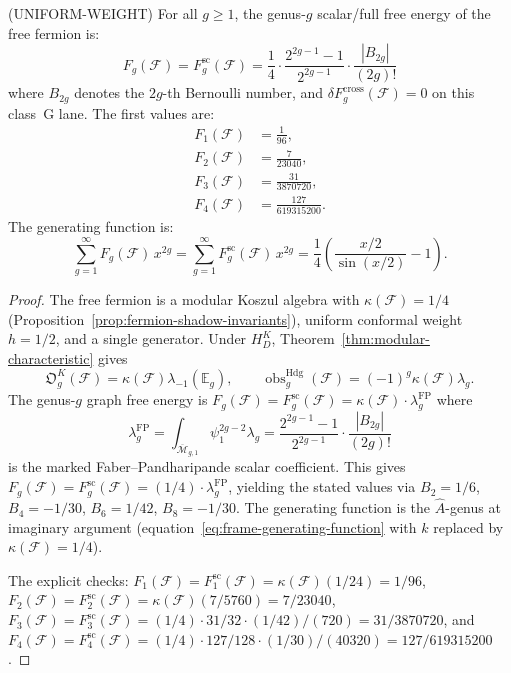 \begin{theorem}
\textup{(}UNIFORM-WEIGHT\textup{})
\label{thm:fermion-genus-expansion}
For all $g \geq 1$, the genus-$g$ scalar/full free energy of the free
fermion is:
\begin{equation}\label{eq:fermion-Fg}
F_g(\mathcal{F})
=F_g^{\mathrm{sc}}(\mathcal{F})
= \frac{1}{4} \cdot \frac{2^{2g-1}-1}{2^{2g-1}}
 \cdot \frac{|B_{2g}|}{(2g)!}
\end{equation}
where $B_{2g}$ denotes the $2g$-th Bernoulli number, and
$\delta F_g^{\mathrm{cross}}(\mathcal F)=0$ on this class~G lane.
The first values are:
\begin{align}
F_1(\mathcal{F}) &= \frac{1}{96},
 \label{eq:fermion-F1} \\
F_2(\mathcal{F}) &= \frac{7}{23040},
 \label{eq:fermion-F2} \\
F_3(\mathcal{F}) &= \frac{31}{3870720},
 \label{eq:fermion-F3} \\
F_4(\mathcal{F}) &= \frac{127}{619315200}.
 \label{eq:fermion-F4}
\end{align}
The generating function is:
\begin{equation}\label{eq:fermion-generating-function}
\sum_{g=1}^{\infty} F_g(\mathcal{F})\,x^{2g}
=\sum_{g=1}^{\infty} F_g^{\mathrm{sc}}(\mathcal{F})\,x^{2g}
= \frac{1}{4}\left(\frac{x/2}{\sin(x/2)} - 1\right).
\end{equation}
\end{theorem}

\begin{proof}
The free fermion is a modular Koszul algebra
with $\kappa(\mathcal{F}) = 1/4$
\textup{(}Proposition~\textup{\ref{prop:fermion-shadow-invariants}}\textup{)},
uniform conformal weight $h = 1/2$, and a single generator. Under
$H_D^K$, Theorem~\ref{thm:modular-characteristic} gives
\[
 \mathfrak O_g^K(\mathcal F)
 =\kappa(\mathcal F)\lambda_{-1}(\mathbb E_g),
 \qquad
 \operatorname{obs}^{\mathrm{Hdg}}_g(\mathcal F)
 =(-1)^g\kappa(\mathcal F)\lambda_g.
\]
The genus-$g$ graph free energy is
$F_g(\mathcal{F})=F_g^{\mathrm{sc}}(\mathcal{F})
 = \kappa(\mathcal{F}) \cdot \lambda_g^{\mathrm{FP}}$ where
\[
\lambda_g^{\mathrm{FP}}
=\int_{\overline{\mathcal M}_{g,1}}\psi_1^{2g-2}\lambda_g
= \frac{2^{2g-1}-1}{2^{2g-1}} \cdot \frac{|B_{2g}|}{(2g)!}
\]
is the marked Faber--Pandharipande scalar coefficient. This gives
$F_g(\mathcal{F})=F_g^{\mathrm{sc}}(\mathcal{F})
= (1/4) \cdot \lambda_g^{\mathrm{FP}}$, yielding the
stated values via $B_2 = 1/6$, $B_4 = -1/30$, $B_6 = 1/42$,
$B_8 = -1/30$.
The generating function is the $\hat{A}$-genus at imaginary argument
(equation~\eqref{eq:frame-generating-function} with $k$ replaced
by $\kappa(\mathcal F)=1/4$).

The explicit checks:
$F_1(\mathcal F)=F_1^{\mathrm{sc}}(\mathcal F)
=\kappa(\mathcal F)(1/24)=1/96$,
$F_2(\mathcal F)=F_2^{\mathrm{sc}}(\mathcal F)
=\kappa(\mathcal F)(7/5760)=7/23040$,
$F_3(\mathcal F)=F_3^{\mathrm{sc}}(\mathcal F)
=(1/4)\cdot31/32\cdot(1/42)/(720)=31/3870720$,
and
$F_4(\mathcal F)=F_4^{\mathrm{sc}}(\mathcal F)
=(1/4)\cdot127/128\cdot(1/30)/(40320)=127/619315200$.
\end{proof}

